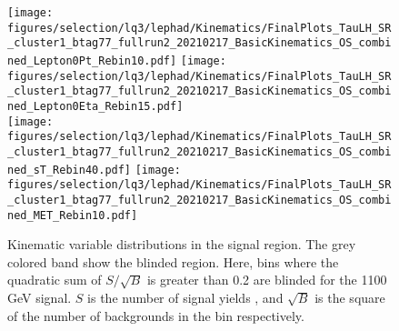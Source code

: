 \FloatBarrier

\begin{figure}
  \centering
  \texttt{[image: figures/selection/lq3/lephad/Kinematics/FinalPlots\_TauLH\_SR\_cluster1\_btag77\_fullrun2\_20210217\_BasicKinematics\_OS\_combined\_Lepton0Pt\_Rebin10.pdf]}
  \texttt{[image: figures/selection/lq3/lephad/Kinematics/FinalPlots\_TauLH\_SR\_cluster1\_btag77\_fullrun2\_20210217\_BasicKinematics\_OS\_combined\_Lepton0Eta\_Rebin15.pdf]} \\
  \texttt{[image: figures/selection/lq3/lephad/Kinematics/FinalPlots\_TauLH\_SR\_cluster1\_btag77\_fullrun2\_20210217\_BasicKinematics\_OS\_combined\_sT\_Rebin40.pdf]} 
  \texttt{[image: figures/selection/lq3/lephad/Kinematics/FinalPlots\_TauLH\_SR\_cluster1\_btag77\_fullrun2\_20210217\_BasicKinematics\_OS\_combined\_MET\_Rebin10.pdf]} \\
  \caption{Kinematic variable distributions in the signal region. The grey colored band show the blinded region. Here, bins where the quadratic sum of $S/\sqrt{B}$ is greater than 0.2 are blinded for the 1100 GeV signal. $S$ is the number of signal yields , and $\sqrt{B}$ is the square of the number of backgrounds in the bin respectively.}
  \label{fig:lq_lephad_kinvars2}
\end{figure}

\FloatBarrier
